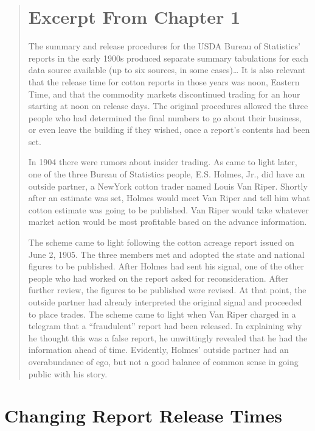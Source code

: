\documentclass[]{book}
\theoremstyle{definition}
\theoremstyle{definition}
\theoremstyle{remark}
\begin{document}
\begin{quote}
\section{Excerpt From Chapter 1}\label{excerpt-from-chapter-1}

The summary and release procedures for the USDA Bureau of Statistics'
reports in the early 1900s produced separate summary tabulations for
each data source available (up to six sources, in some cases)\ldots{} It
is also relevant that the release time for cotton reports in those years
was noon, Eastern Time, and that the commodity markets discontinued
trading for an hour starting at noon on release days. The original
procedures allowed the three people who had determined the final numbers
to go about their business, or even leave the building if they wished,
once a report's contents had been set.

In 1904 there were rumors about insider trading. As came to light later,
one of the three Bureau of Statistics people, E.S. Holmes, Jr., did have
an outside partner, a NewYork cotton trader named Louis Van Riper.
Shortly after an estimate was set, Holmes would meet Van Riper and tell
him what cotton estimate was going to be published. Van Riper would take
whatever market action would be most profitable based on the advance
information.

The scheme came to light following the cotton acreage report issued on
June 2, 1905. The three members met and adopted the state and national
figures to be published. After Holmes had sent his signal, one of the
other people who had worked on the report asked for reconsideration.
After further review, the figures to be published were revised. At that
point, the outside partner had already interpreted the original signal
and proceeded to place trades. The scheme came to light when Van Riper
charged in a telegram that a ``fraudulent'' report had been released. In
explaining why he thought this was a false report, he unwittingly
revealed that he had the information ahead of time. Evidently, Holmes'
outside partner had an overabundance of ego, but not a good balance of
common sense in going public with his story. \citep{history2007Nass}
\end{quote}

\section{Changing Report Release
Times}\label{changing-report-release-times}
\end{document}
